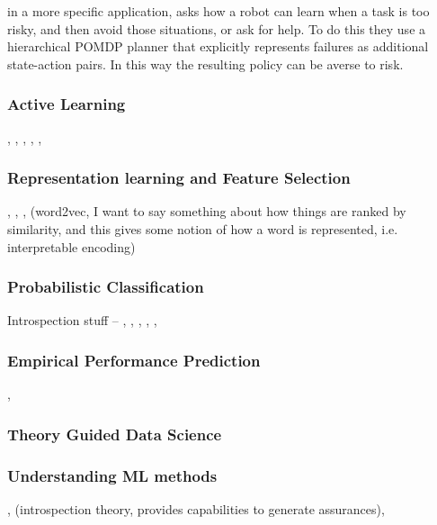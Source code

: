     \citet{Curran2016-ij} in a more specific application, asks how a robot can learn when a task is too risky, and then avoid those situations, or ask for help. To do this they use a hierarchical POMDP planner that explicitly represents failures as additional state-action pairs. In this way the resulting policy can be averse to risk.
    

\subsubsection{Active Learning}
\citet{Paul2011-vr}, \citet{Holub2008-pe}, \citet{Joshi2009-ws}, \citet{Kapoor2010-cy}, \citet{Triebel2013-ow}, \citet{MacKay1992-sp}

\subsubsection{Representation learning and Feature Selection} \citet{Bengio2013-uv}, \citet{Guyon2003-fj}, \citet{Haury2011-zi}, \citet{Mikolov2013-lt}(word2vec, I want to say something about how things are ranked by similarity, and this gives some notion of how a word is represented, i.e. interpretable encoding)




\subsubsection{Probabilistic Classification}
Introspection stuff -- \citet{Grimmett2013-gj}, \citet{Triebel2013-ku}, \citet{Triebel2016-kj}, \citet{Berczi2015-rd}, \citet{Grimmett2016-yc}, \citet{Dequaire2016-kh}

\subsubsection{Empirical Performance Prediction} \citet{Hutter2006-ak}, \citet{Leyton-Brown2009-yr}

\subsubsection{Theory Guided Data Science} \citet{Faghmous2014-og}

\subsubsection{Understanding ML methods} \citet{Bakry2015-td}, \citet{Konolige1985-vx} (introspection theory, provides capabilities to generate assurances),  

